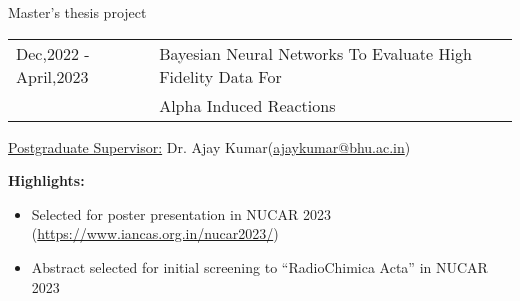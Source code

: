\begin{rubric}{\color{Maroon}Master's thesis project}
\entry*[] 
\begin{tabular}{ll}
\hspace{-0.45cm}   Dec,2022 -April,2023 & 
Bayesian Neural Networks To Evaluate High Fidelity Data 
For\\
 &  Alpha Induced Reactions
\end{tabular}


 \underline{Postgraduate Supervisor:} Dr. Ajay Kumar(\url{ajaykumar@bhu.ac.in})

\vspace{0.5cm}
 \textbf{\color{Red}Highlights:}

 \begin{itemize}
   \item Selected for poster presentation in NUCAR 2023 (\url{https://www.iancas.org.in/nucar2023/})
   \item Abstract selected for initial screening to “RadioChimica Acta” in NUCAR 2023
 \end{itemize}



\end{rubric}
